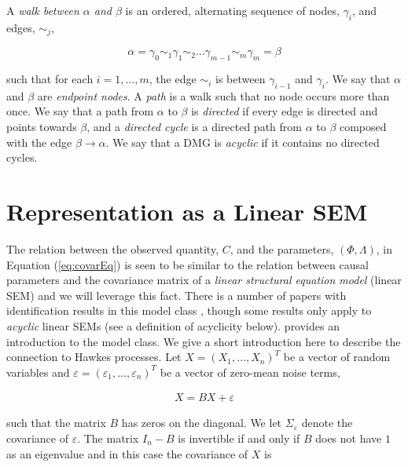 \documentclass[accepted]{uai2021} %
\begin{document}
A {\it walk between $\alpha$ and $\beta$} is an ordered, alternating sequence 
of nodes, $\gamma_i$, and edges, $\sim_j$,

$$
\alpha = \gamma_0 \sim_1 \gamma_1 \sim_2 \ldots \gamma_{m-1} \sim_m \gamma_{m} 
= \beta
$$

such that for each $i = 1,\ldots,m$, the edge $\sim_i$ is between 
$\gamma_{i-1}$ and $\gamma_i$. We say that $\alpha$ and $\beta$ are 
\emph{endpoint nodes}. A {\it path} is a walk such that no node occurs 
more than once. We say that a path from $\alpha$ to $\beta$ is \emph{directed} 
if every edge is directed and points towards $\beta$, and a \emph{directed 
cycle} is a directed path from $\alpha$ to $\beta$ composed with the edge 
$\beta\rightarrow\alpha$. We say that a DMG is \emph{acyclic} if it contains no 
directed cycles.



\section{Representation as a Linear SEM}

The relation between the observed quantity, $C$, and the parameters, $(\Phi, 
\Lambda)$, 
in 
Equation (\ref{eq:covarEq}) is seen to be similar to the relation between 
causal parameters and the covariance matrix of a \emph{linear structural 
	equation model} (linear SEM) and we will leverage this fact. 
There is 
a number of papers with 
identification results in this model class \citep{brito2002, tian2007, 
	tian2009, 
	foygelHalftrek2012, 
	chenNIPS2016, drton2016, 
	weihs2018}, though some results only apply to \emph{acyclic} linear SEMs 
	(see a 
definition of acyclicity below). \cite{bollen1989} provides an introduction to 
the model class. We give a short introduction here to describe the connection 
to 
Hawkes processes. Let $X = (X_1,\ldots,X_n)^T$ be a vector of random variables 
and 
$\varepsilon = 
(\varepsilon_1,\ldots,\varepsilon_n)^T$ be a vector of zero-mean noise terms,

\begin{align}
X = BX + \varepsilon
\label{eq:SEM}
\end{align}

such that the matrix $B$ has zeros on the diagonal. We let $\Sigma_\varepsilon$ 
denote the covariance of $\varepsilon$. The matrix $I_n - B$ is invertible if 
and only if $B$ does not have $1$ as an eigenvalue and in this case the
covariance of $X$ is
\end{document}
